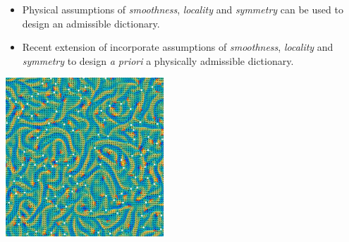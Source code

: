 \documentclass[aspectratio=169,compress,12pt,dvipsnames]{beamer}
\begin{document}
\begin{frame}
    \vfill
    \begin{minipage}{.68\textwidth}
        \begin{itemize}
            \item Physical assumptions of \emph{smoothness}, \emph{locality} and \emph{symmetry} can be used to design an admissible dictionary.
            \par\bigskip
            \item Recent extension of incorporate assumptions of \emph{smoothness}, \emph{locality} and \emph{symmetry} to design \emph{a priori} a physically admissible dictionary.
        \end{itemize}
    \end{minipage}%
    \hfill
    \begin{minipage}{.28\textwidth}
        \centering
        \includegraphics[width=\textwidth]{imgs/active_turbulence.jpeg}
    \end{minipage}
    \vfill
\end{frame}
\end{document}
